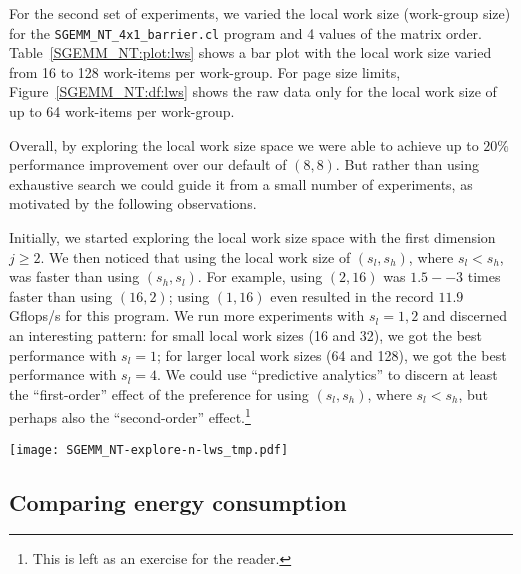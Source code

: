 \documentclass{acm_proc_article-sp} %
\begin{document}
For the second set of experiments, we varied the local work size (work-group
size) for the \verb|SGEMM_NT_4x1_barrier.cl| program and 4 values of the
matrix order.
%
Table~\ref{SGEMM_NT:plot:lws} shows a bar plot with the local work size varied
from 16 to 128 work-items per work-group.
%
For page size limits, Figure~\ref{SGEMM_NT:df:lws} shows the raw data only for the
local work size of up to 64 work-items per work-group.

Overall, by exploring the local work size space we were able to achieve up to
$20\%$ performance improvement over our default of $(8,8)$.
%
But rather than using exhaustive search we could guide it from a small number
of experiments, as motivated by the following observations.

Initially, we started exploring the local work size space with the first
dimension $j \ge 2$.
%
We then noticed that using the local work size of $(s_l, s_h)$, where $s_l <
s_h$, was faster than using $(s_h, s_l)$.
%
For example, using $(2, 16)$ was $1.5--3$ times faster than using $(16, 2)$;
using $(1, 16)$ even resulted in the record $11.9$ Gflops/s for this program.
%
We run more experiments with $s_l = 1, 2$ and discerned an interesting pattern:
for small local work sizes (16 and 32), we got the best performance with $s_l =
1$; for larger local work sizes (64 and 128), we got the best performance with
$s_l = 4$.
%
We could use ``predictive analytics'' to discern at least the ``first-order''
effect of the preference for using $(s_l, s_h)$, where $s_l < s_h$, but perhaps
also the ``second-order'' effect.\footnote{This is left as an exercise for the
reader.}

\begin{sidewaysfigure*}
  \texttt{[image: SGEMM\_NT-explore-n-lws\_tmp.pdf]}
  \caption{The performance of {\tt SGEMM\_NT\_4x1\_barrier.cl} across work-group sizes with up to 64 work-items.}
  \label{SGEMM_NT:plot:lws}
\end{sidewaysfigure*}

\begin{table*}
  \centering
  \caption{\label{SGEMM_NT:df:lws}The performance of {\tt SGEMM\_NT\_4x1\_barrier.cl} work-group sizes with up to 64 work-items.}
  
\end{table*}

\subsection{Comparing energy consumption}
\end{document}
